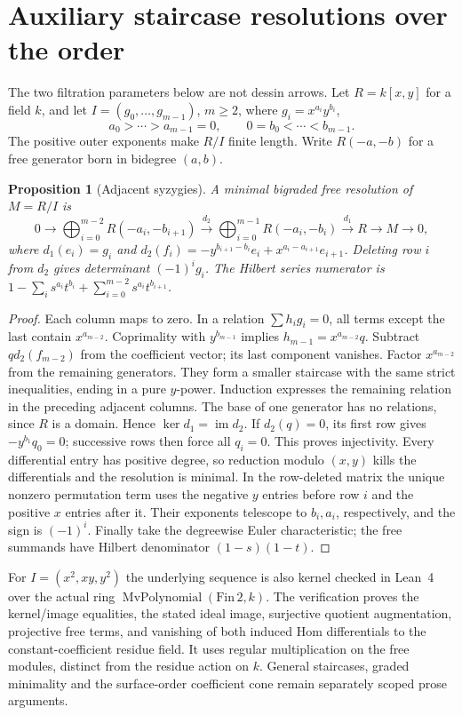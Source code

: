 \documentclass[11pt,oneside,openany]{book}
\newtheorem{proposition}[theorem]{Proposition}
\theoremstyle{definition}\newtheorem{definition}[theorem]{Definition}
\theoremstyle{remark}\newtheorem{remark}[theorem]{Remark}
\begin{document}
\section{Auxiliary staircase resolutions over the order}
The two filtration parameters below are not dessin arrows. Let $R=k[x,y]$
for a field $k$, and let $I=(g_0,\ldots,g_{m-1})$, $m\ge2$, where
$g_i=x^{a_i}y^{b_i}$,
\[
 a_0>\cdots>a_{m-1}=0,\qquad 0=b_0<\cdots<b_{m-1}.
\]
The positive outer exponents make $R/I$ finite length. Write $R(-a,-b)$
for a free generator born in bidegree $(a,b)$.
\begin{proposition}[Adjacent syzygies]\label{thm:staircase}
A minimal bigraded free resolution of $M=R/I$ is
\[
0\longrightarrow\bigoplus_{i=0}^{m-2}R(-a_i,-b_{i+1})
\xrightarrow{d_2}\bigoplus_{i=0}^{m-1}R(-a_i,-b_i)
\xrightarrow{d_1}R\longrightarrow M\longrightarrow0,
\]
where $d_1(e_i)=g_i$ and
$d_2(f_i)=-y^{b_{i+1}-b_i}e_i+x^{a_i-a_{i+1}}e_{i+1}$.
Deleting row $i$ from $d_2$ gives determinant $(-1)^ig_i$.
The Hilbert series numerator is
$1-\sum_i s^{a_i}t^{b_i}+\sum_{i=0}^{m-2}s^{a_i}t^{b_{i+1}}$.
\end{proposition}
\begin{proof}
Each column maps to zero. In a relation $\sum h_i g_i=0$, all terms except
the last contain $x^{a_{m-2}}$. Coprimality with $y^{b_{m-1}}$ implies
$h_{m-1}=x^{a_{m-2}}q$. Subtract $q d_2(f_{m-2})$ from the coefficient
vector; its last component vanishes. Factor $x^{a_{m-2}}$ from the remaining
generators. They form a smaller staircase with the same strict inequalities,
ending in a pure $y$-power. Induction expresses the remaining relation in
the preceding adjacent columns. The base of one generator has no relations,
since $R$ is a domain. Hence $\ker d_1=\operatorname{im}d_2$.
If $d_2(q)=0$, its first row gives $-y^{b_1}q_0=0$; successive rows then
force all $q_i=0$. This proves injectivity. Every differential entry has
positive degree, so reduction modulo $(x,y)$ kills the differentials and
the resolution is minimal. In the row-deleted matrix the unique nonzero
permutation term uses the negative $y$ entries before row $i$ and the
positive $x$ entries after it. Their exponents telescope to $b_i,a_i$,
respectively, and the sign is $(-1)^i$. Finally take the degreewise Euler
characteristic; the free summands have Hilbert denominator $(1-s)(1-t)$.
\end{proof}
For $I=(x^2,xy,y^2)$ the underlying sequence is also kernel checked
in Lean~4 over the actual ring $\operatorname{MvPolynomial}(\mathrm{Fin}\,2,k)$.
The verification proves the kernel/image equalities, the stated ideal image,
surjective quotient augmentation, projective free terms, and vanishing of
both induced Hom differentials to the constant-coefficient residue field.
It uses regular multiplication on the free modules, distinct from the
residue action on $k$. General staircases, graded minimality and the
surface-order coefficient cone remain separately scoped prose arguments.
\end{document}
